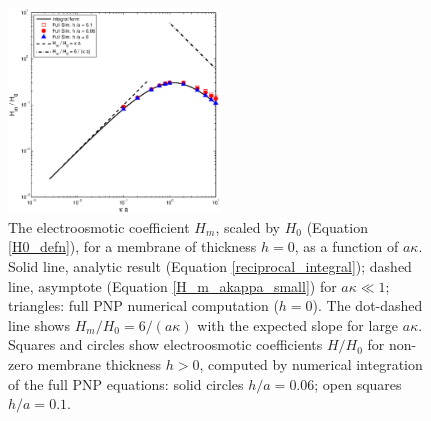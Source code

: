\begin{figure}[ht]
\centering
\includegraphics[width=0.50\textwidth]{finite_thickness/HmOverH0LogLog3}
\caption{The electroosmotic coefficient $H_{m}$, scaled by $H_0$ (Equation \ref{H0_defn}), for a membrane of thickness $h=0$, as a function of $a\kappa$. Solid line, analytic result (Equation \ref{reciprocal_integral}); dashed line, asymptote (Equation \ref{H_m_akappa_small}) for $a\kappa\ll 1$;
triangles: full PNP numerical computation ($h=0$). The dot-dashed line shows $H_{m}/H_0=6/(a\kappa)$ with the expected slope for large $a\kappa$. Squares and circles show electroosmotic coefficients $H/H_0$ for non-zero membrane thickness $h>0$, computed by numerical integration of the full PNP equations: solid circles  $h/a=0.06$; open squares $h/a=0.1$.}
\label{Fig:H_m_log_log}
\end{figure}

